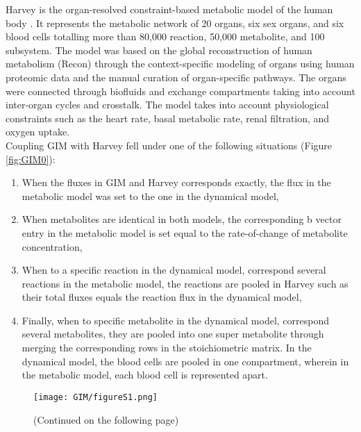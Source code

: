 Harvey is the organ-resolved constraint-based metabolic model of the human body \cite{thiele2018metabolism}. It represents the metabolic network of 20 organs, six sex organs, and six blood cells totalling more than 80,000 reaction, 50,000 metabolite, and 100 subsystem. The model was based on the global reconstruction of human metabolism (Recon) through the context-specific modeling of organs using human proteomic data and the manual curation of organ-specific pathways. The organs were connected through biofluids and exchange compartments taking into account inter-organ cycles and crosstalk. The model takes into account physiological constraints such as the heart rate, basal metabolic rate, renal filtration, and oxygen uptake.\\
Coupling GIM with Harvey fell under one of the following situations (Figure \ref{fig:GIM0}):\\
\begin{enumerate}
\item When the fluxes in GIM and Harvey corresponds exactly, the flux in the metabolic model was set to the one in the dynamical model,
\item When metabolites are identical in both models, the corresponding b vector entry in the metabolic model is set equal to the rate-of-change of metabolite concentration,
\item When to a specific reaction in the dynamical model, correspond several reactions in the metabolic model, the reactions are pooled in Harvey such as their total fluxes equals the reaction flux in the dynamical model,
\item Finally, when to specific metabolite in the dynamical model, correspond several metabolites, they are pooled into one super metabolite through merging the corresponding rows in the stoichiometric matrix. In the dynamical model, the blood cells are pooled in one compartment, wherein in the metabolic model, each blood cell is represented apart.
\end{enumerate}
\begin{figure}[!htp]
\centering
	\texttt{[image: GIM/figureS1.png]}%
	\caption[Enrichment analysis of the type 1 diabetes genes.]{(Continued on the following page)}
	\label{fig:s0GIM}
\end{figure}
\begin{figure}[t]
\end{figure}
